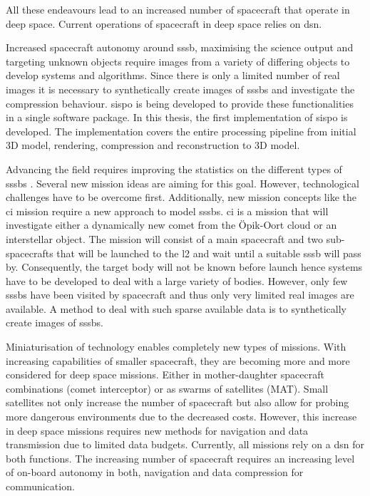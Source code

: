 All these endeavours lead to an increased number of spacecraft that operate in deep space. Current operations of spacecraft in deep space relies on \gls{dsn}.

Increased spacecraft autonomy around \gls{sssb}, maximising the science output and targeting unknown objects require images from a variety of differing objects to develop systems and algorithms. Since there is only a limited number of real images it is necessary to synthetically create images of \gls{sssb}s and investigate the compression behaviour. \gls{sispo} is being developed to provide these functionalities in a single software package.
In this thesis, the first implementation of \gls{sispo} is developed. The implementation covers the entire processing pipeline from initial 3D model, rendering, compression and reconstruction to 3D model.

Advancing the field requires improving the statistics on the different types of \gls{sssb}s \cite{Pajusalu2019CharacterizationMapping}. Several new mission ideas are aiming for this goal. However, technological challenges have to be overcome first. Additionally, new mission concepts like the \gls{ci} mission require a new approach to model \gls{sssb}s. \gls{ci} is a mission that will investigate either a dynamically new comet from the Öpik-Oort cloud or an interstellar object. The mission will consist of a main spacecraft and two sub-spacecrafts that will be launched to the \gls{l2} and wait until a suitable \gls{sssb} will pass by. Consequently, the target body will not be known before launch hence systems have to be developed to deal with a large variety of bodies. However, only few \gls{sssb}s have been visited by spacecraft and thus only very limited real images are available. A method to deal with such sparse available data is to synthetically create images of \gls{sssb}s.

Miniaturisation of technology enables completely new types of missions. With increasing capabilities of smaller spacecraft, they are becoming more and more considered for deep space missions. Either in mother-daughter spacecraft combinations (comet interceptor) or as swarms of satellites (MAT). Small satellites not only increase the number of spacecraft but also allow for probing more dangerous environments due to the decreased costs. However, this increase in deep space missions requires new methods for navigation and data transmission due to limited data budgets. Currently, all missions rely on a \gls{dsn} for both functions. The increasing number of spacecraft requires an increasing level of on-board autonomy in both, navigation and data compression for communication.

